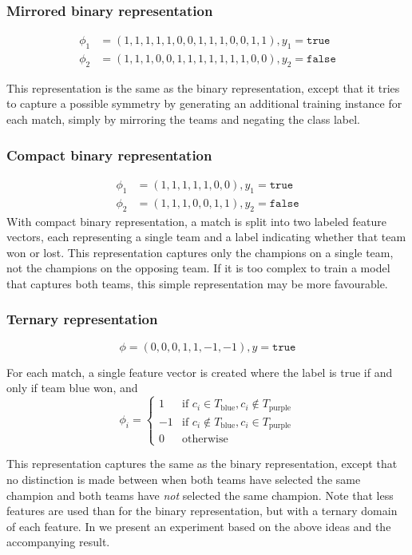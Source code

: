 \subsubsection{Mirrored binary representation}

\begin{align*}
  \phi_1 &= (1,1,1,1,1,0,0,1,1,1,0,0,1,1), y_1 = \texttt{true}\\
  \phi_2 &= (1,1,1,0,0,1,1,1,1,1,1,1,0,0), y_2 = \texttt{false}
\end{align*}

This representation is the same as the binary representation, except that it tries to capture a possible symmetry by generating an additional training instance for each match, simply by mirroring the teams and negating the class label.

\subsubsection{Compact binary representation}
\begin{align*}
  \phi_1 &= (1,1,1,1,1,0,0), y_1 = \mathtt{true} \\
  \phi_2 &= (1,1,1,0,0,1,1), y_2 =\mathtt{false}
\end{align*}
With compact binary representation, a match is split into two labeled feature vectors, each representing a single team and a label indicating whether that team won or lost.
This representation captures only the champions on a single team, not the champions on the opposing team.
If it is too complex to train a model that captures both teams, this simple representation may be more favourable.

\subsubsection{Ternary representation}

\[\phi = (0,0,0,1,1,-1,-1), y = \mathtt{true}\]

For each match, a single feature vector is created where the label is true if and only if team blue won, and
\[
    \phi_i = 
\begin{cases}
  1  & \text{if } c_i \in T_\text{blue}, c_i \not\in T_\text{purple}\\
  -1 & \text{if } c_i \not\in T_\text{blue}, c_i \in T_\text{purple}\\
  0  & \text{otherwise}
\end{cases}
\]

This representation captures the same as the binary representation, except that no distinction is made between when both teams have selected the same champion and both teams have \emph{not} selected the same champion.
Note that less features are used than for the binary representation, but with a ternary domain of each feature. In  we present an experiment based on the above ideas and the accompanying result.

